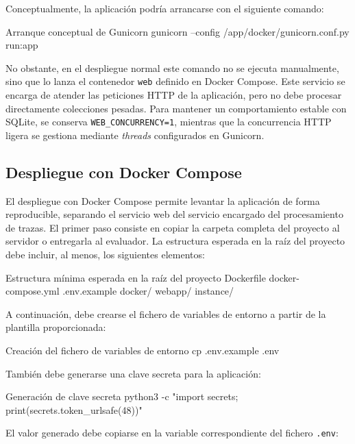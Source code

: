 Conceptualmente, la aplicación podría arrancarse con el siguiente comando:

\begin{dockerbox}{Arranque conceptual de Gunicorn}
gunicorn --config /app/docker/gunicorn.conf.py run:app
\end{dockerbox}

No obstante, en el despliegue normal este comando no se ejecuta manualmente, sino que lo lanza el contenedor \texttt{web} definido en Docker Compose. Este servicio se encarga de atender las peticiones HTTP de la aplicación, pero no debe procesar directamente colecciones pesadas. Para mantener un comportamiento estable con SQLite, se conserva \texttt{WEB\_CONCURRENCY=1}, mientras que la concurrencia HTTP ligera se gestiona mediante \textit{threads} configurados en Gunicorn.

\subsection{Despliegue con Docker Compose}

El despliegue con Docker Compose permite levantar la aplicación de forma reproducible, separando el servicio web del servicio encargado del procesamiento de trazas. El primer paso consiste en copiar la carpeta completa del proyecto al servidor o entregarla al evaluador. La estructura esperada en la raíz del proyecto debe incluir, al menos, los siguientes elementos:

\begin{infocmdbox}{Estructura mínima esperada en la raíz del proyecto}
Dockerfile
docker-compose.yml
.env.example
docker/
webapp/
instance/
\end{infocmdbox}

A continuación, debe crearse el fichero de variables de entorno a partir de la plantilla proporcionada:

\begin{dockerbox}{Creación del fichero de variables de entorno}
cp .env.example .env
\end{dockerbox}

También debe generarse una clave secreta para la aplicación:

\begin{pythonbox}{Generación de clave secreta}
python3 -c "import secrets; print(secrets.token_urlsafe(48))"
\end{pythonbox}

El valor generado debe copiarse en la variable correspondiente del fichero \texttt{.env}:

